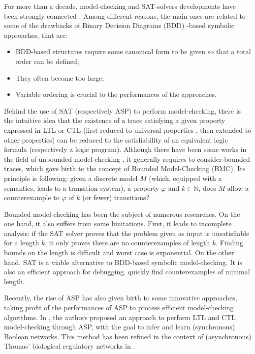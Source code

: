 For more than a decade, model-checking and SAT-solvers developments have been strongly connected \cite{biere1999symbolic}. Among different reasons, the main ones are related to some of the drawbacks of Binary Decision Diagrams (BDD) -based symbolic approaches, that are:
\begin{itemize}
\item BDD-based structures require some canonical form to be given so that a total order can be defined; 
\item They often become too large;
\item Variable ordering is crucial to the performances of the approaches.  
\end{itemize}

Behind the use of SAT (respectively ASP) to perform model-checking, there is the intuitive idea that the existence of a trace satisfying a given property expressed in LTL \cite{biere1999symbolic} or CTL (first reduced to universal properties \cite{penczek2002bounded}, then extended to other properties) can be reduced to the satisfiability of an equivalent logic formula (respectively a logic program). Although there have been some works in the field of unbounded model-checking \cite{mcmillan2002applying}, it generally requires to consider bounded traces, which gave birth to the concept of Bounded Model-Checking (BMC). Its principle is following: given a discrete model $M$ (which, equipped with a semantics, leads to a transition system), a property $\varphi$ and $k \in \mathbb{N}$, does $M$ allow a counterexample to $\varphi$ of $k$ (or fewer) transitions? 

Bounded model-checking has been the subject of numerous researches. On the one hand, it also suffers from some limitations. First, it leads to incomplete analysis: if the SAT solver proves that the problem given as input is unsatisfiable for a length $k$, it only proves there are no counterexamples of length $k$. Finding bounds on the length is difficult and worst case is exponential. On the other hand, SAT is a viable alternative to BDD-based symbolic model-checking. It is also an efficient approach for debugging, \ie quickly find counterexamples of minimal length. 

Recently, the rise of ASP has also given birth to some innovative approaches, taking profit of the performances of ASP to process efficient model-checking algorithms. In \cite{rocca2013inference}, the authors proposed an approach to perform LTL and CTL model-checking through ASP, with the goal to infer and learn (synchronous) Boolean networks. This method has been refined in the context of (asynchronous) Thomas' biological regulatory networks in \cite{roccaasp}. 

